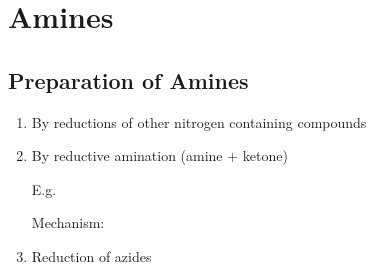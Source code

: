 \section{Amines}

\subsection{Preparation of Amines}

\begin{enumerate}[label=\alph*)]

  \item By reductions of other nitrogen containing compounds

  \item By reductive amination (amine + ketone)


    E.g.


    Mechanism:


  \item Reduction of azides

\end{enumerate}
